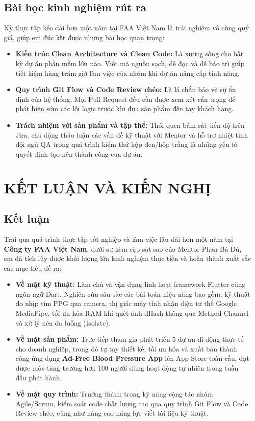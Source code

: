 \documentclass[12pt, a4paper]{article}
\begin{document}
\subsection{Bài học kinh nghiệm rút ra}
Kỳ thực tập kéo dài hơn một năm tại FAA Việt Nam là trải nghiệm vô cùng quý giá, giúp em đúc kết được những bài học quan trọng:
\begin{itemize}
    \item \textbf{Kiến trúc Clean Architecture và Clean Code:} Là xương sống cho bất kỳ dự án phần mềm lớn nào. Viết mã nguồn sạch, dễ đọc và dễ bảo trì giúp tiết kiệm hàng trăm giờ làm việc của nhóm khi dự án nâng cấp tính năng.
    \item \textbf{Quy trình Git Flow và Code Review chéo:} Là lá chắn bảo vệ sự ổn định của hệ thống. Mọi Pull Request đều cần được xem xét cẩn trọng để phát hiện sớm các lỗi logic trước khi đưa sản phẩm đến tay khách hàng.
    \item \textbf{Trách nhiệm với sản phẩm và tập thể:} Thói quen bám sát tiến độ trên Jira, chủ động thảo luận các vấn đề kỹ thuật với Mentor và hỗ trợ nhiệt tình đội ngũ QA trong quá trình kiểm thử hộp đen/hộp trắng là những yếu tố quyết định tạo nên thành công của dự án.
\end{itemize}

\section{KẾT LUẬN VÀ KIẾN NGHỊ}

\subsection{Kết luận}
Trải qua quá trình thực tập tốt nghiệp và làm việc lâu dài hơn một năm tại \textbf{Công ty FAA Việt Nam}, dưới sự kèm cặp sát sao của Mentor Phan Bá Đủ, em đã tích lũy được khối lượng lớn kinh nghiệm thực tiễn và hoàn thành xuất sắc các mục tiêu đề ra:
\begin{itemize}
    \item \textbf{Về mặt kỹ thuật:} Làm chủ và vận dụng linh hoạt framework Flutter cùng ngôn ngữ Dart. Nghiên cứu sâu sắc các bài toán hiệu năng bao gồm: kỹ thuật đo nhịp tim PPG qua camera, thị giác máy tính nhận diện tư thế Google MediaPipe, tối ưu hóa RAM khi quét ảnh dHash thông qua Method Channel và xử lý nén đa luồng (Isolate).
    \item \textbf{Về mặt sản phẩm:} Trực tiếp tham gia phát triển 5 dự án di động thực tế cho doanh nghiệp, trong đó tự tay thiết kế, tối ưu hóa và xuất bản thành công ứng dụng \textbf{Ad-Free Blood Pressure App} lên App Store toàn cầu, đạt được mốc tăng trưởng hơn 100 người dùng hoạt động tự nhiên trong tuần đầu phát hành.
    \item \textbf{Về mặt quy trình:} Trưởng thành trong kỹ năng cộng tác nhóm Agile/Scrum, kiểm soát code chất lượng cao qua quy trình Git Flow và Code Review chéo, cũng như nâng cao năng lực viết tài liệu kỹ thuật.
\end{itemize}
\end{document}
